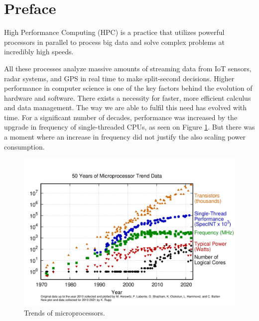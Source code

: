 %
%

\chapter*{Preface}

High Performance Computing (HPC) \cite{Assiroj:2018:High} is a practice that utilizes powerful processors in parallel to process big data and solve complex problems at incredibly high speeds.

All these processes analyze massive amounts of streaming data from IoT sensors, radar systems, and GPS in real time to make split-second decisions.
Higher performance in computer science is one of the key factors behind the evolution of hardware and software.
There exists a necessity for faster, more efficient calculus and data management.
The way we are able to fulfil this need has evolved with time.
For a significant number of decades, performance was increased by the upgrade in frequency of single-threaded CPUs, as seen on Figure \ref{fig:processor-trend}.
But there was a moment where an increase in frequency did not justify the also scaling power consumption.

\begin{figure}[H]
	\centering
	\includegraphics[width=\linewidth]{images/50-years-processor-trend.png}
	\caption{Trends of microprocessors.}
	\label{fig:processor-trend}
\end{figure}
